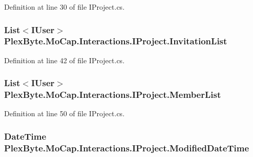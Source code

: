 Definition at line 30 of file I\+Project.\+cs.

\subsubsection[{\texorpdfstring{Invitation\+List}{InvitationList}}]{\setlength{\rightskip}{0pt plus 5cm}List$<$I\+User$>$ Plex\+Byte.\+Mo\+Cap.\+Interactions.\+I\+Project.\+Invitation\+List\hspace{0.3cm}{\ttfamily [get]}}\hypertarget{interface_plex_byte_1_1_mo_cap_1_1_interactions_1_1_i_project_a377cc2be7bd29881bfc0b50a4a5e2cdd}{}\label{interface_plex_byte_1_1_mo_cap_1_1_interactions_1_1_i_project_a377cc2be7bd29881bfc0b50a4a5e2cdd}


Definition at line 42 of file I\+Project.\+cs.

\subsubsection[{\texorpdfstring{Member\+List}{MemberList}}]{\setlength{\rightskip}{0pt plus 5cm}List$<$I\+User$>$ Plex\+Byte.\+Mo\+Cap.\+Interactions.\+I\+Project.\+Member\+List\hspace{0.3cm}{\ttfamily [get]}}\hypertarget{interface_plex_byte_1_1_mo_cap_1_1_interactions_1_1_i_project_afd9d799c7b5d0054ef537212bcead510}{}\label{interface_plex_byte_1_1_mo_cap_1_1_interactions_1_1_i_project_afd9d799c7b5d0054ef537212bcead510}


Definition at line 50 of file I\+Project.\+cs.

\subsubsection[{\texorpdfstring{Modified\+Date\+Time}{ModifiedDateTime}}]{\setlength{\rightskip}{0pt plus 5cm}Date\+Time Plex\+Byte.\+Mo\+Cap.\+Interactions.\+I\+Project.\+Modified\+Date\+Time\hspace{0.3cm}{\ttfamily [get]}}\hypertarget{interface_plex_byte_1_1_mo_cap_1_1_interactions_1_1_i_project_aee621c808ca4a5d55d494800eae4f6c3}{}\label{interface_plex_byte_1_1_mo_cap_1_1_interactions_1_1_i_project_aee621c808ca4a5d55d494800eae4f6c3}


